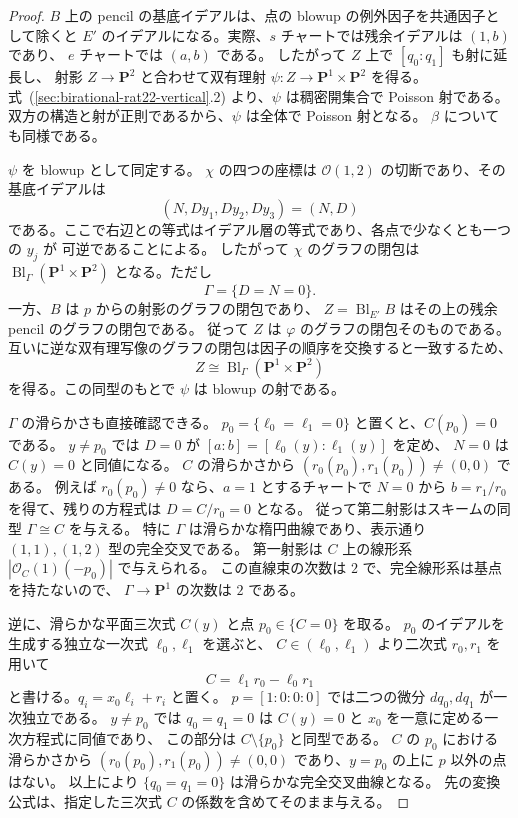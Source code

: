 \begin{proof}
$B$ 上の pencil の基底イデアルは、点の blowup の例外因子を共通因子として除くと
$E'$ のイデアルになる。実際、$s$ チャートでは残余イデアルは $(1,b)$ であり、
$e$ チャートでは $(a,b)$ である。
したがって $Z$ 上で $[q_0:q_1]$ も射に延長し、
射影 $Z\to\mathbf P^2$ と合わせて双有理射
$\psi\colon Z\to\mathbf P^1\times\mathbf P^2$ を得る。
式~(\ref{sec:birational-rat22-vertical}.2) より、$\psi$ は稠密開集合で Poisson 射である。
双方の構造と射が正則であるから、$\psi$ は全体で Poisson 射となる。
$\beta$ についても同様である。

$\psi$ を blowup として同定する。
$\chi$ の四つの座標は $\mathcal O(1,2)$ の切断であり、その基底イデアルは
\[
 (N,Dy_1,Dy_2,Dy_3)=(N,D)
\]
である。ここで右辺との等式はイデアル層の等式であり、各点で少なくとも一つの $y_j$ が
可逆であることによる。
したがって $\chi$ のグラフの閉包は
$\operatorname{Bl}_{\Gamma}(\mathbf P^1\times\mathbf P^2)$ となる。ただし
\[
 \Gamma=\{D=N=0\}.
\]
一方、$B$ は $p$ からの射影のグラフの閉包であり、
$Z=\operatorname{Bl}_{E'}B$ はその上の残余 pencil のグラフの閉包である。
従って $Z$ は $\varphi$ のグラフの閉包そのものである。
互いに逆な双有理写像のグラフの閉包は因子の順序を交換すると一致するため、
\[
 Z\cong\operatorname{Bl}_{\Gamma}(\mathbf P^1\times\mathbf P^2)
\]
を得る。この同型のもとで $\psi$ は blowup の射である。

$\Gamma$ の滑らかさも直接確認できる。
$p_0=\{\ell_0=\ell_1=0\}$ と置くと、$C(p_0)=0$ である。
$y\ne p_0$ では $D=0$ が $[a:b]=[\ell_0(y):\ell_1(y)]$ を定め、
$N=0$ は $C(y)=0$ と同値になる。
$C$ の滑らかさから $(r_0(p_0),r_1(p_0))\ne(0,0)$ である。
例えば $r_0(p_0)\ne0$ なら、$a=1$ とするチャートで
$N=0$ から $b=r_1/r_0$ を得て、残りの方程式は
$D=C/r_0=0$ となる。
従って第二射影はスキームの同型 $\Gamma\cong C$ を与える。
特に $\Gamma$ は滑らかな楕円曲線であり、表示通り $(1,1),(1,2)$ 型の完全交叉である。
第一射影は $C$ 上の線形系 $|\mathcal O_C(1)(-p_0)|$ で与えられる。
この直線束の次数は $2$ で、完全線形系は基点を持たないので、
$\Gamma\to\mathbf P^1$ の次数は $2$ である。

逆に、滑らかな平面三次式 $C(y)$ と点 $p_0\in\{C=0\}$ を取る。
$p_0$ のイデアルを生成する独立な一次式 $\ell_0,\ell_1$ を選ぶと、
$C\in(\ell_0,\ell_1)$ より二次式 $r_0,r_1$ を用いて
\[
 C=\ell_1r_0-\ell_0r_1
\]
と書ける。$q_i=x_0\ell_i+r_i$ と置く。
$p=[1:0:0:0]$ では二つの微分 $dq_0,dq_1$ が一次独立である。
$y\ne p_0$ では $q_0=q_1=0$ は $C(y)=0$ と $x_0$ を一意に定める一次方程式に同値であり、
この部分は $C\setminus\{p_0\}$ と同型である。
$C$ の $p_0$ における滑らかさから
$(r_0(p_0),r_1(p_0))\ne(0,0)$ であり、$y=p_0$ の上に $p$ 以外の点はない。
以上により $\{q_0=q_1=0\}$ は滑らかな完全交叉曲線となる。
先の変換公式は、指定した三次式 $C$ の係数を含めてそのまま与える。
\end{proof}

